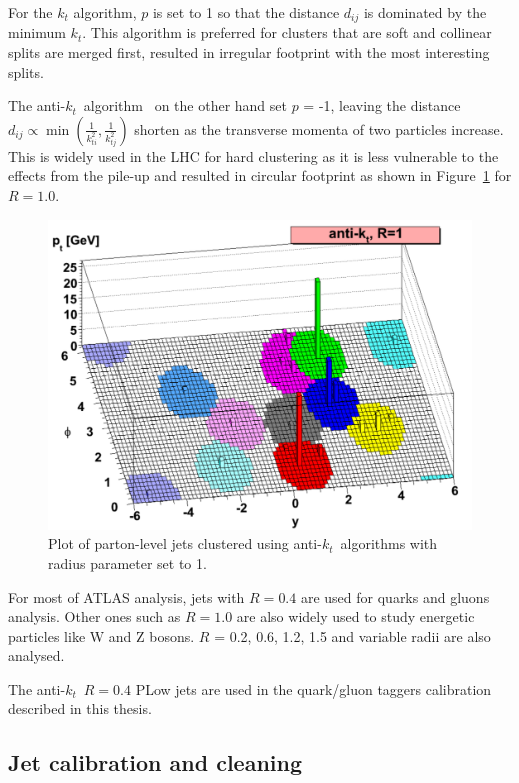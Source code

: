 For the $k_t$ algorithm, $p$ is set to 1 so that the distance $d_{i j}$ is dominated by the minimum $k_t$. This algorithm is preferred for clusters that are soft and collinear splits are merged first, resulted in irregular footprint with the most interesting splits.

The anti-$k_t$~algorithm~\cite{Cacciari:2008gp} on the other hand set $p$ = -1, leaving the distance $d_{i j} \propto \min \left(\frac{1}{k_{t i}^2}, \frac{1}{k_{t j}^2}\right)$ shorten as the transverse momenta of two particles increase. This is widely used in the LHC for hard clustering as it is less vulnerable to the effects from the pile-up and resulted in circular footprint as shown in Figure~\ref{Fig.kt} for $R = 1.0$.

\begin{figure}[htb] 
	\centering  
	\includegraphics[width=12cm]{./fig/kt.png}	\caption{Plot of parton-level jets clustered using anti-$k_t$~algorithms with radius parameter set to 1.}
	\label{Fig.kt}
\end{figure}

For most of ATLAS analysis, jets with $R = 0.4$ are used for quarks and gluons analysis. Other ones such as $R = 1.0$ are also widely used to study energetic particles like W and Z bosons. $R$ = 0.2, 0.6, 1.2, 1.5 and variable radii are also analysed.

The anti-$k_t$~$R = 0.4$ PLow jets are used in the quark/gluon taggers calibration described in this thesis.



\subsection{Jet calibration and cleaning}
\label{sec:4.2}

